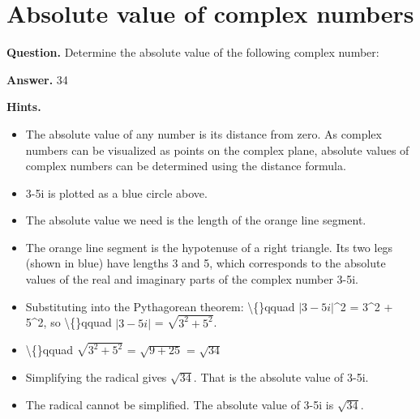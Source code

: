 \documentclass{article}
\begin{document}
\section*{Absolute value of complex numbers}
\textbf{Question.} Determine the absolute value of the following complex number:

\textbf{Answer.} 34

\textbf{Hints.}
\begin{itemize}
  \item The absolute value of any number is its distance from zero.
                    As complex numbers can be visualized as points on the complex plane, absolute values
                    of complex numbers can be determined using the distance formula.
  \item 3-5i is plotted as a blue circle above.
  \item The absolute value we need is the length of the orange line segment.
  \item The orange line segment is the hypotenuse of a right triangle.
                        Its two legs (shown in blue) have lengths 3 and 5, which corresponds
                        to the absolute values of the real and imaginary parts of the complex number 3-5i.
  \item Substituting into the Pythagorean theorem:
                    \textbackslash\{\}qquad $| 3-5i |$\textasciicircum{}2 = 3\textasciicircum{}2 + 5\textasciicircum{}2, so 
                    \textbackslash\{\}qquad $| 3-5i |$ = $\sqrt{3^2 + 5^2}$.
  \item \textbackslash\{\}qquad $\sqrt{3^2 + 5^2}$ = $\sqrt{9 + 25}$ = $\sqrt{34}$
  \item Simplifying the radical gives $\sqrt{34}$. That is the absolute value of 3-5i.
  \item The radical cannot be simplified. The absolute value of 3-5i is $\sqrt{34}$.
\end{itemize}
\end{document}
